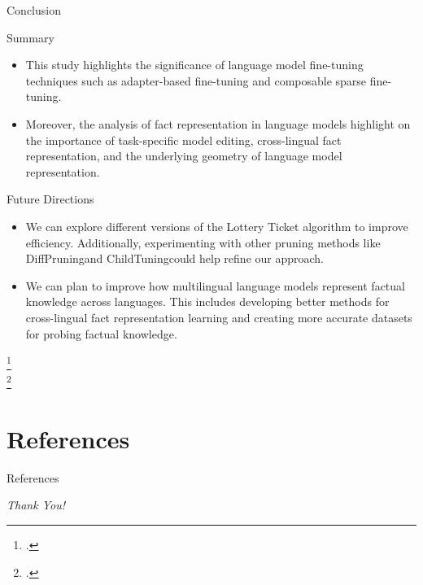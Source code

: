 \documentclass{beamer}
\begin{document}
	\begin{frame}{Conclusion}
		\begin{block}{\scriptsize Summary}\scriptsize
			\begin{itemize}
				\item This study highlights the significance of language model fine-tuning techniques such as adapter-based fine-tuning and composable sparse fine-tuning.
				
				\item Moreover, the analysis of fact representation in language models highlight on the importance of task-specific model editing, cross-lingual fact representation, and the underlying geometry of language model representation. 
			\end{itemize}
		\end{block}
		\begin{block}{\scriptsize Future Directions}\scriptsize
			\begin{itemize}
				\item We can explore different versions of the Lottery Ticket algorithm to improve efficiency. Additionally, experimenting with other pruning methods like DiffPruning\footnotemark and ChildTuning\footnotemark could help refine our approach. 
				\item We can plan to improve how multilingual language models represent factual knowledge across languages. This includes developing better methods for cross-lingual fact representation learning and creating more accurate datasets for probing factual knowledge. 
			\end{itemize}
		\end{block}
		\footcitetext{guo2021parameterefficient}\\
		\footcitetext{xu2021raise}
	\end{frame}

	\section{References}
	\begin{frame}{References}
		\begin{block}{}\scriptsize
			\printbibliography
		\end{block}
	\end{frame}
	
	\begin{frame}{}
		\centering \Huge
		\emph{Thank You!}
	\end{frame}
	
\end{document}
